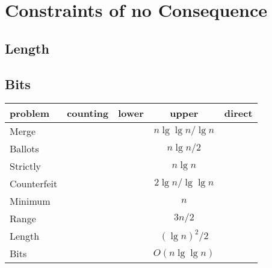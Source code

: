 \documentclass[11pt, justified]{tufte-book}
\theoremstyle{definition}
\newcommand{\msec}[1]{{\let\clearpage\relax\chapter{\color{mblu}\textsf{#1}}}}
\newcommand{\msub}[1]{\vspace{0.3cm}\section{\color{mblu}\textsf{#1}}}
\begin{document}

    \msec{Constraints of no Consequence}
      \msub{Length}
      \msub{Bits}

      \begin{tabular}{lcccc}
          problem       &       counting        &       lower       &       upper       &       direct      \\
          \hline
          Merge         &                       &                   & $n\lg\lg n/\lg n$ &                   \\
          Ballots       &                       &                   & $n \lg n/2$       &                   \\
          Strictly      &                       &                   & $n \lg n$         &                   \\
          Counterfeit   &                       &                   & $2\lg n/\lg\lg n$ &                   \\
          Minimum       &                       &                   & $n$               &                   \\
          Range         &                       &                   & $3n/2$            &                   \\
          Length        &                       &                   & $(\lg n)^2/2$     &                   \\
          Bits          &                       &                   & $O(n\lg\lg n)$    &                   \\
      \end{tabular}

%
\end{document}
